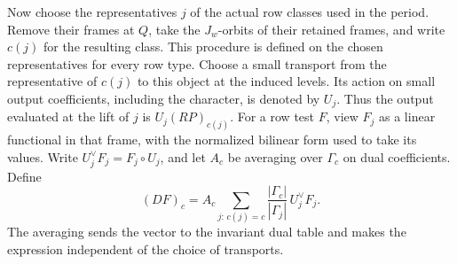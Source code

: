 \documentclass[a4paper,11pt]{article}
\theoremstyle{definition}
\theoremstyle{remark}
\numberwithin{equation}{section}
\begin{document}
Now choose the representatives \(j\) of the actual row classes
used in the period. Remove their frames at \(Q\), take the
\(J_w\)-orbits of their retained frames, and write \(c(j)\) for
the resulting class. This procedure is defined on the chosen
representatives for every row type. Choose a small transport from
the representative of \(c(j)\) to this object at the induced
levels. Its action on small output coefficients, including the
character, is denoted by \(U_j\). Thus the output evaluated
at the lift of \(j\) is \(U_j(RP)_{c(j)}\). For a row test
\(F\), view \(F_j\) as a linear functional in that frame, with
the normalized bilinear form used to take its values.
Write \(U_j^\vee F_j=F_j\circ U_j\), and let \(A_c\) be
averaging over \(\Gamma_c\) on dual coefficients. Define
\[
  (D F)_c=A_c\!\sum_{j:\,c(j)=c}
           \frac{|\Gamma_c|}{|\Gamma_j|}\,U_j^\vee F_j.
\]
The averaging sends the vector to the invariant dual table
and makes the expression independent of the choice of transports.
\end{document}
